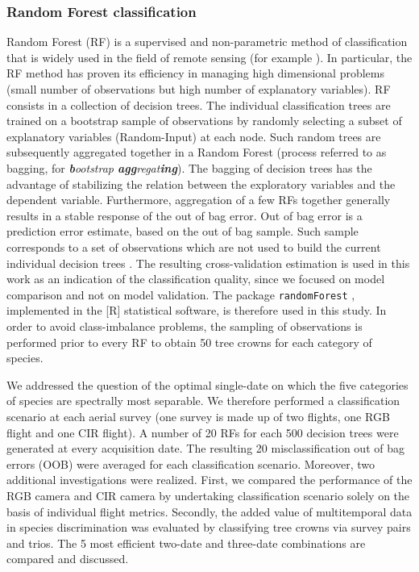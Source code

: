 \documentclass[remotesensing,article,submit,moreauthors,pdftex,12pt,a4paper]{mdpi} %
\begin{document}
\subsubsection{Random Forest classification}

Random Forest (RF) is a supervised and non-parametric method of classification that is widely used in the field of remote sensing (for example \cite{stumpf_object-oriented_2011,burkholder_seasonal_2011,immitzer_tree_2012, zhu_continuous_2014}). 
In particular, the RF method has proven its efficiency in managing high dimensional problems \cite{genuer_variable_2010} (small number of observations but high number of explanatory variables). 
RF consists in a collection of decision trees. 
The individual classification trees are trained on a bootstrap sample of observations by randomly selecting a subset of explanatory variables (Random-Input) at each node. 
Such random trees are subsequently aggregated together in a Random Forest (process referred to as bagging, for \textit{\textbf{b}ootstrap \textbf{agg}regat\textbf{ing}}). 
The bagging of decision trees has the advantage of stabilizing the relation between the exploratory variables and the dependent variable. 
Furthermore, aggregation of a few RFs together generally results in a stable response of the out of bag error. 
Out of bag error is a prediction error estimate, based on the out of bag sample. Such sample corresponds to a set of observations which are not used to build the current individual decision trees \cite{genuer_variable_2010}. 
The resulting cross-validation estimation is used in this work as an indication of the classification quality, since we focused on model comparison and not on model validation. 
The package {\tt randomForest} \cite{liaw_classification_2002}, implemented in the [R] statistical software, is therefore used in this study. 
In order to avoid class-imbalance problems, the sampling of observations is performed prior to every RF to obtain 50 tree crowns for each category of species. 

We addressed the question of the optimal single-date on which the five categories of species are spectrally most separable. We therefore performed a classification scenario at each aerial survey (one survey is made up of two flights, one RGB flight and one CIR flight). 
A number of 20 RFs for each 500 decision trees were generated at every acquisition date.
The resulting 20 misclassification out of bag errors (OOB) were averaged for each classification scenario. 
Moreover, two additional investigations were realized. 
First, we compared the performance of the RGB camera and CIR camera by undertaking classification scenario solely on the basis of individual flight metrics. 
Secondly, the added value of multitemporal data in species discrimination was evaluated by classifying tree crowns via survey pairs and trios.
The 5 most efficient two-date and three-date combinations are compared and discussed.
\end{document}
